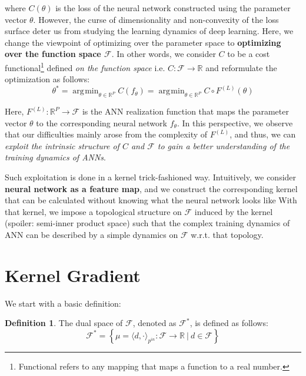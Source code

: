 \documentclass{article}
\theoremstyle{plain}
\theoremstyle{definition}
\newtheorem{definition}[theorem]{Definition}
\theoremstyle{remark}
\DeclareMathOperator*{\argmin}{\arg\!\min}
\begin{document}
where $C(\theta)$ is the loss of the neural network constructed using the parameter vector $\theta$.
However, the curse of dimensionality and non-convexity of the loss surface deter us from studying the learning dynamics of deep learning.
Here, we change the viewpoint of optimizing over the parameter space to {\bf optimizing over the function space $\mathcal{F}$}.
In other words, we consider $C$ to be a cost functional\footnote{Functional refers to any mapping that maps a function to a real number.} defined {\it on the function space} i.e. $C : \mathcal{F} \rightarrow \mathbb{R}$ and reformulate the optimization as follows:
\begin{equation}
	\theta^* = \argmin_{\theta \in \mathbb{R}^P} C(f_\theta) = \argmin_{\theta \in \mathbb{R}^P} C \circ F^{(L)}(\theta)
\end{equation}

Here, $F^{(L)} : \mathbb{R}^P \rightarrow \mathcal{F}$ is the ANN realization function that maps the parameter vector $\theta$ to the corresponding neural network $f_\theta$.
In this perspective, we observe that our difficulties mainly arose from the complexity of $F^{(L)}$, and thus, we can {\it exploit the intrinsic structure of $C$ and $\mathcal{F}$ to gain a better understanding of the training dynamics of ANNs}.

Such exploitation is done in a kernel trick-fashioned way.
Intuitively, we consider {\bf neural network as a feature map}, and we construct the corresponding kernel that can be calculated without knowing what the neural network looks like
With that kernel, we impose a topological structure on $\mathcal{F}$ induced by the kernel (spoiler: semi-inner product space) such that the complex training dynamics of ANN can be described by a simple dynamics on $\mathcal{F}$ w.r.t. that topology.



\section{Kernel Gradient}
We start with a basic definition:
\begin{definition}
	The dual space of $\mathcal{F}$, denoted as $\mathcal{F}^*$, is defined as follows:
	\begin{equation*}
		\mathcal{F}^* = \left\{ \mu = \langle d, \cdot \rangle_{p^{in}} : \mathcal{F} \rightarrow \mathbb{R} \ | \ d \in \mathcal{F} \right\}
	\end{equation*}
\end{definition}
\end{document}
